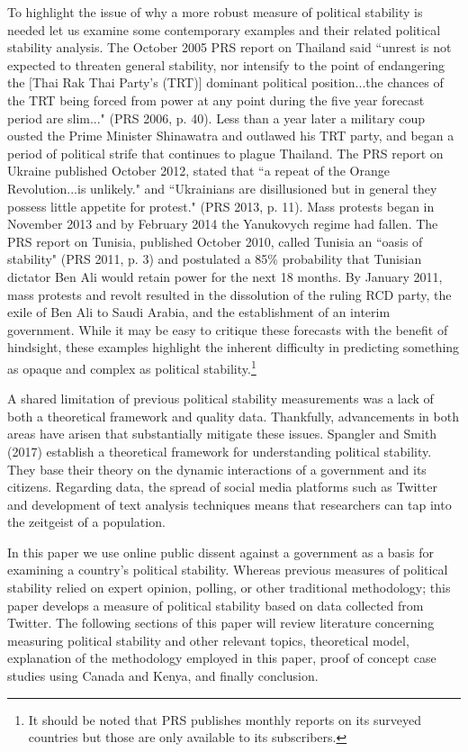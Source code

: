 \documentclass[12pt]{article}
\begin{document}
\begin{spacing}{1.5}
To highlight the issue of why a more robust measure of political stability is needed let us examine some contemporary examples and their related political stability analysis. The October 2005 PRS report on Thailand said ``unrest is not expected to threaten general stability, nor intensify to the point of endangering the [Thai Rak Thai Party's (TRT)] dominant political position...the chances of the TRT being forced from power at any point during the five year forecast period are slim..." (PRS 2006, p. 40). Less than a year later a military coup ousted the Prime Minister Shinawatra and outlawed his TRT party, and began a period of political strife that continues to plague Thailand. The PRS report on Ukraine published October 2012, stated that ``a repeat of the Orange Revolution...is unlikely." and ``Ukrainians are disillusioned but in general they possess little appetite for protest." (PRS 2013, p. 11). Mass protests began in November 2013 and by February 2014 the Yanukovych regime had fallen. The PRS report on Tunisia, published October 2010, called Tunisia an ``oasis of stability" (PRS 2011, p. 3) and postulated a 85\% probability that Tunisian dictator Ben Ali would retain power for the next 18 months. By January 2011, mass protests and revolt resulted in the dissolution of the ruling RCD party, the exile of Ben Ali to Saudi Arabia, and the establishment of an interim government. While it may be easy to critique these forecasts with the benefit of hindsight, these examples highlight the inherent difficulty in predicting something as opaque and complex as political stability.\footnote{It should be noted that PRS publishes monthly reports on its surveyed countries but those are only available to its subscribers.} 

A shared limitation of previous political stability measurements was a lack of both a theoretical framework and quality data. Thankfully, advancements in both areas have arisen that substantially mitigate these issues. Spangler and Smith (2017) establish a theoretical framework for understanding political stability. They base their theory on the dynamic interactions of a government and its citizens. Regarding data, the spread of social media platforms such as Twitter and development of text analysis techniques means that researchers can tap into the zeitgeist of a population.

In this paper we use online public dissent against a government as a basis for examining a country's political stability. Whereas previous measures of political stability relied on expert opinion, polling, or other traditional methodology; this paper develops a measure of political stability based on data collected from Twitter. The following sections of this paper will review literature concerning measuring political stability and other relevant topics, theoretical model, explanation of the methodology employed in this paper, proof of concept case studies using Canada and Kenya, and finally conclusion. 


\end{spacing}
\end{document}
